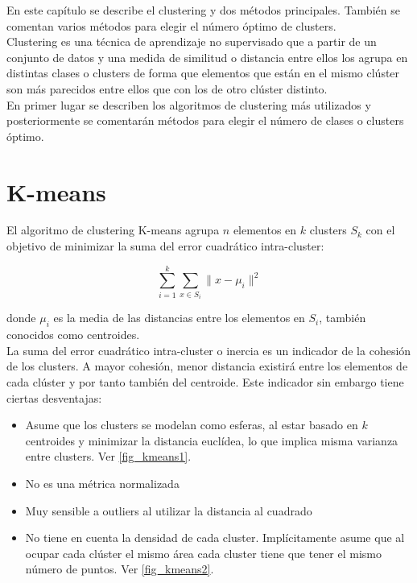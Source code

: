 En este capítulo se describe el clustering y dos métodos principales. También se comentan varios métodos para elegir el número óptimo de clusters. \\

Clustering es una técnica de aprendizaje no supervisado que a partir de un conjunto de datos y una medida de similitud o distancia entre ellos los agrupa en distintas clases o clusters de forma que elementos que están en el mismo clúster son más parecidos entre ellos que con los de otro clúster distinto. \\

En primer lugar se describen los algoritmos de clustering más utilizados y posteriormente se comentarán métodos para elegir el número de clases o clusters óptimo. \\

\section{K-means}
El algoritmo de clustering K-means agrupa $n$ elementos en $k$ clusters $S_k$ con el objetivo de minimizar la suma del error cuadrático intra-cluster:

\begin{equation}
\sum_{i=1}^{k}\sum_{x\in S_i}\lVert x-\mu_{i}\rVert ^2 \nonumber
\end{equation}

donde $\mu_i$ es la media de las distancias entre los elementos en $S_i$, también conocidos como centroides. \\

La suma del error cuadrático intra-cluster o inercia es un indicador de la cohesión de los clusters. A mayor cohesión, menor distancia existirá entre los elementos de cada clúster y por tanto también del centroide. Este indicador sin embargo tiene ciertas desventajas:
\begin{itemize}
\item Asume que los clusters se modelan como esferas, al estar basado en $k$ centroides y minimizar la distancia euclídea, lo que implica misma varianza entre clusters. Ver \ref{fig_kmeans1}.
\item No es una métrica normalizada
\item Muy sensible a outliers al utilizar la distancia al cuadrado
\item No tiene en cuenta la densidad de cada cluster. Implícitamente asume que al ocupar cada clúster el mismo área cada cluster tiene que tener el mismo número de puntos. Ver \ref{fig_kmeans2}.
\end{itemize}


